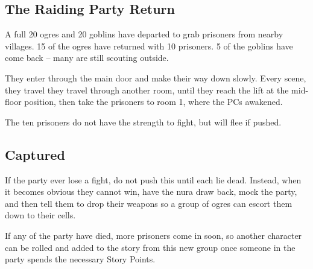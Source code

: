 \begin{multicols}{2}


\subsection{The Raiding Party Return}

A full 20 ogres and 20 goblins have departed to grab prisoners from nearby villages.
15 of the ogres have returned with 10 prisoners.
5 of the goblins have come back -- many are still scouting outside.

They enter through the main door and make their way down slowly.
Every scene, they travel they travel through another room, until they reach the lift at the mid-floor position, then take the prisoners to room 1, where the PCs awakened.




The ten prisoners do not have the strength to fight, but will flee if pushed.

\subsection{Captured}

If the party ever lose a fight, do not push this until each lie dead.
Instead, when it becomes obvious they cannot win, have the nura draw back, mock the party, and then tell them to drop their weapons so a group of ogres can escort them down to their cells.

If any of the party have died, more prisoners come in soon, so another character can be rolled and added to the story from this new group once someone in the party spends the necessary Story Points.

\end{multicols}
